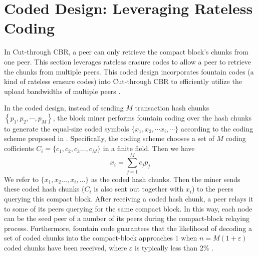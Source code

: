 \documentclass[10pt,journal,compsoc]{IEEEtran}
\begin{document}
\section{Coded Design: Leveraging Rateless Coding}\label{section:Coded}
In Cut-through CBR, a peer can only retrieve the compact block’s chunks from one peer. This section leverages rateless erasure codes to allow a peer to retrieve the chunks from multiple peers. This coded design incorporates fountain codes \cite{luby2002lt} (a kind of rateless erasure codes) into Cut-through CBR to efficiently utilize the upload bandwidths of multiple peers \cite{gkantsidis2005network}. 

In the coded design, instead of sending $M$ transaction hash chunks $\left\{ {{p_1},{p_2}, \cdots ,{p_M}} \right\}$, the block miner performs fountain coding over the hash chunks to generate the equal-size coded symbols $\{ {x_1},{x_2}, \cdots {x_i}, \cdots \}$ according to the coding scheme proposed in \cite{wang2007network}. Specifically, the coding scheme chooses a set of $M$ coding cofficients ${C_i} = \{ {c_1},{c_2},{c_3} \ldots ,{c_M}\}$ in a finite field. Then we have
\begin{equation}
	\label{eqn:networkCoding}
	{x_i} = \sum\limits_{j = 1}^M {{c_j}{p_j}}
\end{equation}
We refer to $\{ {x_1},{x_2} \ldots ,{x_i},...\}$ as the coded hash chunks. Then the miner sends these coded hash chunks (${C_i}$ is also sent out together with ${x_i}$) to the peers querying this compact block. After receiving a coded hash chunk, a peer relays it to some of its peers querying for the same compact block. In this way, each node can be the seed peer of a number of its peers during the compact-block relaying process. Furthermore, fountain code guarantees that the likelihood of decoding a set of coded chunks into the compact-block approaches $1$ when $n = M(1 + \varepsilon)$ coded chunks have been received, where $\varepsilon$ is typically less than $2\%$ \cite{luby2002lt}.
\end{document}
